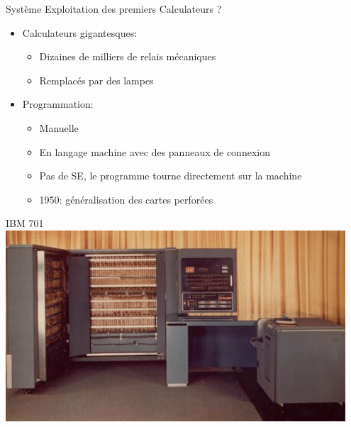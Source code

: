 \documentclass[11pt]{beamer}
\begin{document}
\begin{frame}{Système Exploitation des premiers Calculateurs ?}

\begin{itemize}
\itemsep1pt\parskip0pt
\item
  Calculateurs gigantesques:

  \begin{itemize}
  \itemsep1pt\parskip0pt
  \item
    Dizaines de milliers de relais mécaniques
  \item
    Remplacés par des lampes
  \end{itemize}
\item
  Programmation:
  \begin{itemize}
  \item
    Manuelle
  \item
    En langage machine avec des panneaux de connexion
  \item
    Pas de SE, le programme tourne directement sur la machine
  \item
    1950: généralisation des cartes perforées
  \end{itemize}
\end{itemize}
\end{frame}

\begin{frame}{IBM 701}
  \centering
  \includegraphics[width=0.95\textwidth]{figs/ibm701.png}
\end{frame}
\end{document}
